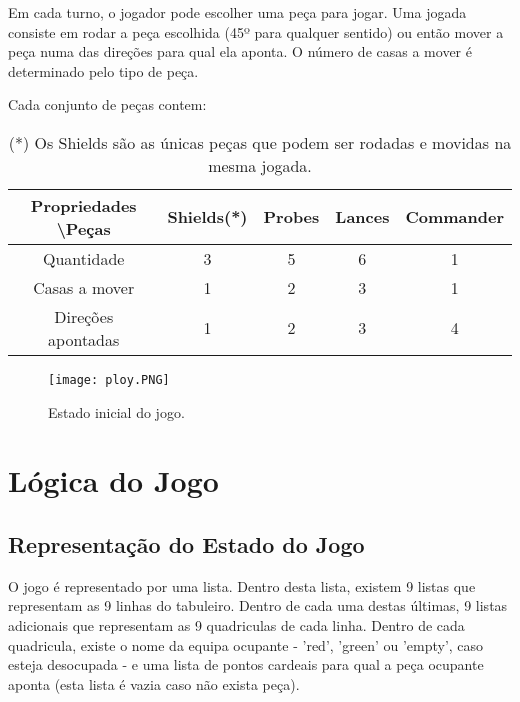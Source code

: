 \documentclass[a4paper]{article}
\begin{document}
Em cada turno, o jogador pode escolher uma peça para jogar. Uma jogada consiste em rodar a peça escolhida (45º para qualquer sentido) ou então mover a peça numa das direções para qual ela aponta. O número de casas a mover é determinado pelo tipo de peça.

Cada conjunto de peças contem:

\begin{table}[ht]
\centering
\begin{tabular}[ht]{|c|c|c|c|c|}
  \hline
Propriedades \textbackslash \space Peças&Shields(*)&Probes&Lances&Commander\\
\hline
Quantidade&3&5&6&1\\
Casas a mover&1&2&3&1\\
Direções apontadas&1&2&3&4\\
\hline
\end{tabular}
\caption{(*) Os Shields são as únicas peças que podem ser rodadas e movidas na mesma jogada.}
\end{table}

\begin{figure}[ht]
\caption{Estado inicial do jogo.}
\centering
\texttt{[image: ploy.PNG]}
\end{figure}
\section{Lógica do Jogo}


\subsection{Representação do Estado do Jogo}
O jogo é representado por uma lista. Dentro desta lista, existem 9 listas que representam as 9 linhas do tabuleiro. Dentro de cada uma destas últimas, 9 listas adicionais que representam as 9 quadriculas de cada linha. Dentro de cada quadricula, existe o nome da equipa ocupante - 'red', 'green' ou 'empty', caso esteja desocupada - e uma lista de pontos cardeais para qual a peça ocupante aponta (esta lista é vazia caso não exista peça).
\end{document}
